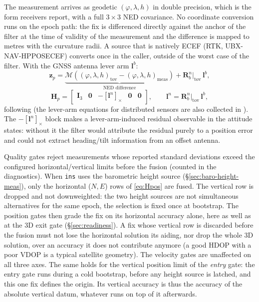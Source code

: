 \documentclass[11pt,a4paper]{article}
\newcommand{\vect}[1]{\bm{#1}}
\newcommand{\mat}[1]{\bm{#1}}
\newcommand{\cross}[1]{\left[#1\right]_{\times}}   %
\newcommand{\nframe}{n}
\newcommand{\bframe}{b}
\newcommand{\Rbn}{\mat{R}_{\bframe}^{\nframe}}
\newcommand{\code}[1]{\texttt{#1}}
\begin{document}
The measurement arrives as geodetic $(\varphi,\lambda,h)$ in double
precision, which is the form receivers report, with a full $3\times 3$ NED
covariance. No coordinate conversion runs on the epoch path: the fix is
differenced directly against the anchor of the filter at the time of
validity of the measurement and the difference is mapped to metres with the
curvature radii. A source that is natively ECEF (RTK, UBX-NAV-HPPOSECEF)
converts once in the caller, outside of the worst case of the filter. With the
GNSS antenna lever arm
$\vect{l}^\bframe$:
\begin{equation}
  \vect{z}_p = \underbrace{\mathcal{M}\!\left(
      (\varphi,\lambda,h)_{\text{tov}} -
      (\varphi,\lambda,h)_{\text{meas}}\right)}_{\text{NED difference}}
  + \Rbn\big|_{\text{tov}}\,\vect{l}^\bframe ,
\end{equation}
\begin{equation}
  \mat{H}_p =
  \begin{bmatrix}
    \mat{I}_3 & \mat{0} & -\cross{\vect{l}^\nframe} & \mat{0} & \mat{0}
  \end{bmatrix},
  \qquad \vect{l}^\nframe = \Rbn\big|_{\text{tov}}\,\vect{l}^\bframe ,
  \label{eq:Hpos}
\end{equation}
following \cite[eq.~8.62]{wendel2011} (the lever-arm equations for distributed
sensors are also collected in \cite{zwiener2019}). The $-\cross{\vect{l}^\nframe}$
block makes a lever-arm-induced residual observable in the attitude
states: without it the filter would attribute the residual purely to a
position error and could not extract heading/tilt information from an
offset antenna.

Quality gates reject measurements whose reported standard deviations
exceed the configured horizontal/vertical limits before the fusion (counted in
the diagnostics). When \code{ins} uses the barometric height source
(\S\ref{sec:baro-height-meas}), only the horizontal ($N,E$) rows of
\eqref{eq:Hpos} are fused. The vertical row is dropped and not
downweighted: the two height sources are not simultaneous alternatives
for the same epoch, the selection is fixed once at bootstrap. The
position gates then grade the fix on its horizontal accuracy alone, here
as well as at the 3D exit gate (\S\ref{sec:readiness}). A fix whose
vertical row is discarded before the fusion must not lose the horizontal
solution its aiding, nor drop the whole 3D solution, over an accuracy it
does not contribute anymore (a good HDOP with a poor VDOP is a typical
satellite geometry). The velocity gates are unaffected on all three axes.
The same holds for the vertical position limit of the \emph{entry} gate: the
entry gate runs during a cold bootstrap, before any height source is latched,
and this one fix defines the origin. Its vertical accuracy is thus the
accuracy of the absolute vertical datum, whatever runs on top of it
afterwards.
\end{document}
